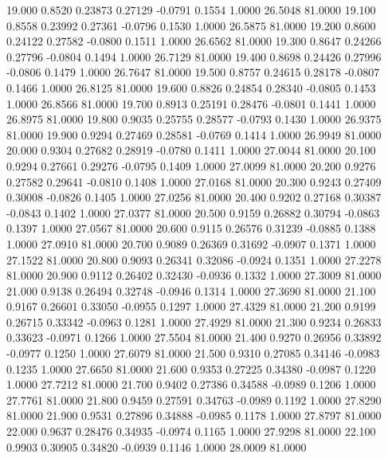   19.000   0.8520   0.23873   0.27129  -0.0791   0.1554   1.0000  26.5048  81.0000
  19.100   0.8558   0.23992   0.27361  -0.0796   0.1530   1.0000  26.5875  81.0000
  19.200   0.8600   0.24122   0.27582  -0.0800   0.1511   1.0000  26.6562  81.0000
  19.300   0.8647   0.24266   0.27796  -0.0804   0.1494   1.0000  26.7129  81.0000
  19.400   0.8698   0.24426   0.27996  -0.0806   0.1479   1.0000  26.7647  81.0000
  19.500   0.8757   0.24615   0.28178  -0.0807   0.1466   1.0000  26.8125  81.0000
  19.600   0.8826   0.24854   0.28340  -0.0805   0.1453   1.0000  26.8566  81.0000
  19.700   0.8913   0.25191   0.28476  -0.0801   0.1441   1.0000  26.8975  81.0000
  19.800   0.9035   0.25755   0.28577  -0.0793   0.1430   1.0000  26.9375  81.0000
  19.900   0.9294   0.27469   0.28581  -0.0769   0.1414   1.0000  26.9949  81.0000
  20.000   0.9304   0.27682   0.28919  -0.0780   0.1411   1.0000  27.0044  81.0000
  20.100   0.9294   0.27661   0.29276  -0.0795   0.1409   1.0000  27.0099  81.0000
  20.200   0.9276   0.27582   0.29641  -0.0810   0.1408   1.0000  27.0168  81.0000
  20.300   0.9243   0.27409   0.30008  -0.0826   0.1405   1.0000  27.0256  81.0000
  20.400   0.9202   0.27168   0.30387  -0.0843   0.1402   1.0000  27.0377  81.0000
  20.500   0.9159   0.26882   0.30794  -0.0863   0.1397   1.0000  27.0567  81.0000
  20.600   0.9115   0.26576   0.31239  -0.0885   0.1388   1.0000  27.0910  81.0000
  20.700   0.9089   0.26369   0.31692  -0.0907   0.1371   1.0000  27.1522  81.0000
  20.800   0.9093   0.26341   0.32086  -0.0924   0.1351   1.0000  27.2278  81.0000
  20.900   0.9112   0.26402   0.32430  -0.0936   0.1332   1.0000  27.3009  81.0000
  21.000   0.9138   0.26494   0.32748  -0.0946   0.1314   1.0000  27.3690  81.0000
  21.100   0.9167   0.26601   0.33050  -0.0955   0.1297   1.0000  27.4329  81.0000
  21.200   0.9199   0.26715   0.33342  -0.0963   0.1281   1.0000  27.4929  81.0000
  21.300   0.9234   0.26833   0.33623  -0.0971   0.1266   1.0000  27.5504  81.0000
  21.400   0.9270   0.26956   0.33892  -0.0977   0.1250   1.0000  27.6079  81.0000
  21.500   0.9310   0.27085   0.34146  -0.0983   0.1235   1.0000  27.6650  81.0000
  21.600   0.9353   0.27225   0.34380  -0.0987   0.1220   1.0000  27.7212  81.0000
  21.700   0.9402   0.27386   0.34588  -0.0989   0.1206   1.0000  27.7761  81.0000
  21.800   0.9459   0.27591   0.34763  -0.0989   0.1192   1.0000  27.8290  81.0000
  21.900   0.9531   0.27896   0.34888  -0.0985   0.1178   1.0000  27.8797  81.0000
  22.000   0.9637   0.28476   0.34935  -0.0974   0.1165   1.0000  27.9298  81.0000
  22.100   0.9903   0.30905   0.34820  -0.0939   0.1146   1.0000  28.0009  81.0000
